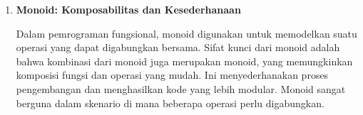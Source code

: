 \documentclass{article}
\begin{document}
\begin{enumerate}
    \item \textbf{Monoid: Komposabilitas dan Kesederhanaan}

    Dalam pemrograman fungsional, monoid digunakan untuk memodelkan suatu 
    operasi yang dapat digabungkan bersama. Sifat kunci dari monoid adalah 
    bahwa kombinasi dari monoid juga merupakan monoid, yang memungkinkan 
    komposisi fungsi dan operasi yang mudah. Ini menyederhanakan proses 
    pengembangan dan menghasilkan kode yang lebih modular. Monoid sangat 
    berguna dalam skenario di mana beberapa operasi perlu digabungkan.
\end{enumerate}
\end{document}
